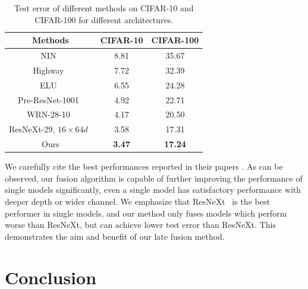 \documentclass[10pt,twocolumn,letterpaper]{article}
\begin{document}
\begin{table}[ht]
\centering
\begin{tabular}{|c|c|c|}\hline
    Methods                                         &  CIFAR-10       & CIFAR-100           \\\hline
NIN~\cite{lin2013network}                           &   8.81          &  35.67              \\\hline
Highway~\cite{srivastava2015highway}                &   7.72          &  32.39              \\\hline
ELU~\cite{clevert2015fast}                          &   6.55          &  24.28              \\\hline
Pre-ResNet-1001~\cite{he2016identity}               &   4.92          &  22.71              \\\hline
WRN-28-10~\cite{zagoruyko2016wide}                  &   4.17          &  20.50              \\\hline
ResNeXt-29, $16\times64d$~\cite{xie2016aggregated}  &   3.58          &  17.31              \\\hline
Ours                                                &   \textbf{3.47} &  \textbf{17.24}     \\\hline
\end{tabular}
\caption{Test error of different methods on CIFAR-10 and CIFAR-100 for different architectures.
}
\label{table:state_of_the_art}
\end{table}

We carefully cite the best performances reported in their papers
\cite{clevert2015fast,he2016identity,lin2013network,srivastava2015highway,xie2016aggregated,zagoruyko2016wide}.
As can be observed, our fusion algorithm is capable of further improving the performance of single models significantly,
even a single model has satisfactory performance with deeper depth or wider channel.
We emphasize that ResNeXt~\cite{xie2016aggregated} is the best performer in single models, and our method only fuses models which perform worse than ResNeXt,
but can achieve lower test error than ResNeXt.
This demonstrates the aim and benefit of our late fusion method.


\section{Conclusion}
\end{document}
